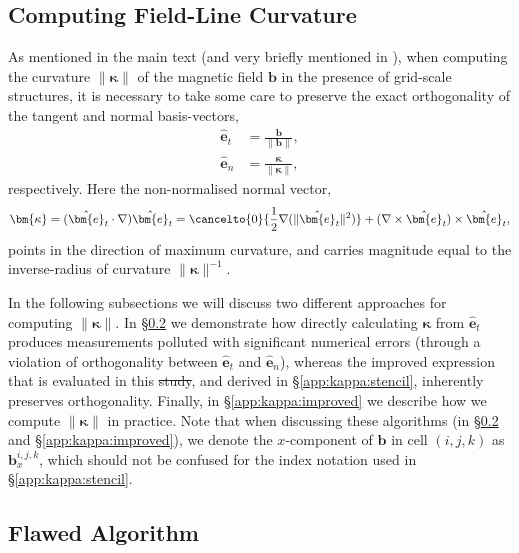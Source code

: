 \documentclass[12pt,twoside]{extreport}
\makeatletter
\newcommand{\mVector}[1]{\bm{#1}} %
\newcommand{\mVectorBase}[1]{\hat{\mVector{e}}_{#1}} %
\providecommand{\DIFaddtex}[1]{{\protect\color{DIFgreen}\uwave{#1}}} %
\providecommand{\DIFdeltex}[1]{{\protect\color{DIFpurple}\sout{#1}}} %
\providecommand{\DIFaddbegin}{} %
\providecommand{\DIFaddend}{} %
\providecommand{\DIFdelbegin}{} %
\providecommand{\DIFdelend}{} %
\providecommand{\DIFadd}[1]{\texorpdfstring{\DIFaddtex{#1}}{#1}} %
\providecommand{\DIFdel}[1]{\texorpdfstring{\DIFdeltex{#1}}{}} %
\providecommand{\DIFscaledelfig}{0.5}
\newlength{\DIFdelgraphicswidth} %
\newlength{\DIFdelgraphicsheight} %
\providecommand{\DIFaddincludegraphics}[2][]{{\color{DIFgreen}\fbox{\DIFOincludegraphics[#1]{#2}}}} %
\providecommand{\DIFdelincludegraphics}[2][]{%
\sbox{\DIFdelgraphicsbox}{\DIFOincludegraphics[#1]{#2}}%
\settoboxwidth{\DIFdelgraphicswidth}{\DIFdelgraphicsbox} %
\settoboxtotalheight{\DIFdelgraphicsheight}{\DIFdelgraphicsbox} %
\scalebox{\DIFscaledelfig}{%
\parbox[b]{\DIFdelgraphicswidth}{\usebox{\DIFdelgraphicsbox}\\[-\baselineskip] \rule{\DIFdelgraphicswidth}{0em}}\llap{\resizebox{\DIFdelgraphicswidth}{\DIFdelgraphicsheight}{%
\setlength{\unitlength}{\DIFdelgraphicswidth}%
\begin{picture}(1,1)%
\thicklines\linethickness{2pt} %
{\color{DIFpurple}\put(0,0){\framebox(1,1){}}}%
{\color{DIFpurple}\put(0,0){\line( 1,1){1}}}%
{\color{DIFpurple}\put(0,1){\line(1,-1){1}}}%
\end{picture}%
}\hspace*{3pt}}} %
} %
\DeclareRobustCommand{\DIFaddbegin}{\DIFOaddbegin \let\includegraphics\DIFaddincludegraphics} %
\DeclareRobustCommand{\DIFaddend}{\DIFOaddend \let\includegraphics\DIFOincludegraphics} %
\DeclareRobustCommand{\DIFdelbegin}{\DIFOdelbegin \let\includegraphics\DIFdelincludegraphics} %
\DeclareRobustCommand{\DIFdelend}{\DIFOaddend \let\includegraphics\DIFOincludegraphics} %
\let\sout@orig\sout %
\renewcommand{\sout}[1]{\ifmmode\text{\sout@orig{\ensuremath{#1}}}\else\sout@orig{#1}\fi} %
\makeatother
\begin{document}
\subsection{Computing Field-Line Curvature}
\label{app:kappa}

As mentioned in the main text (and very briefly mentioned in \citet{schekochihin2004simulations}), when computing the curvature $\|\mVector{\kappa}\|$ of the magnetic field $\mVector{b}$ in the presence of grid-scale structures, it is necessary to take some care to preserve the exact orthogonality of the tangent and normal basis-vectors,
\begin{align}
    \mVectorBase{t}
        &= \frac{\mVector{b}}{\|\mVector{b}\|} , \\
    \mVectorBase{n}
        &= \frac{\mVector{\kappa}}{\|\mVector{\kappa}\|}
    , \label{eqn:nbasis}
\end{align}
respectively. Here the non-normalised normal vector,
\begin{align}
    \mVector{\kappa}
        = (\mVectorBase{t}\cdot\nabla)\mVectorBase{t}
        = \cancelto{0}{\frac{1}{2} \nabla(\|\mVectorBase{t}\|^2)}
            + (\nabla\times\mVectorBase{t}) \times \mVectorBase{t}
        ,
\end{align}
points in the direction of maximum curvature, and carries magnitude equal to the inverse-radius of curvature $\|\mVector{\kappa}\|^{-1}$.

In the following subsections we will discuss two different approaches for computing $\|\mVector{\kappa}\|$. In \S\ref{app:kappa:flawed} we demonstrate how directly calculating $\mVector{\kappa}$ from $\mVectorBase{t}$ produces measurements polluted with significant numerical errors (through a violation of orthogonality between $\mVectorBase{t}$ and $\mVectorBase{n}$), whereas the improved expression that is evaluated in this \DIFdelbegin \DIFdel{study}\DIFdelend \DIFaddbegin \DIFadd{chapter}\DIFaddend , and derived in \S\ref{app:kappa:stencil}, inherently preserves orthogonality. Finally, in \S\ref{app:kappa:improved} we describe how we compute $\|\mVector{\kappa}\|$ in practice. Note that when discussing these algorithms (in \S\ref{app:kappa:flawed} and \S\ref{app:kappa:improved}), we denote the $x$-component of $\mVector{b}$ in cell $(i,j,k)$ as $\mVector{b}_x^{i,j,k}$, which should not be confused for the index notation used in \S\ref{app:kappa:stencil}.

\subsection{Flawed Algorithm}
\label{app:kappa:flawed}
\end{document}
